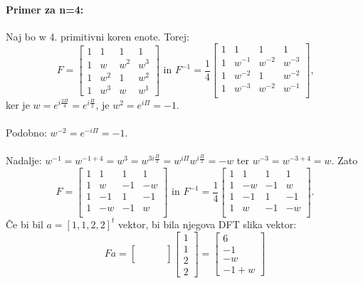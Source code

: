 \documentclass[a4paper,10pt]{article}
\begin{document}
\paragraph{Primer za n=4:}
Naj bo w 4. primitivni koren enote. Torej:
$$
F=
\left [
\begin{array}{llll}
1 & 1 & 1 & 1 \\
1 & w & w^2 & w^3 \\
1 & w^2 & 1 & w^2 \\
1 & w^3 & w & w^1
\end{array}
\right ]
\mbox{ in }
F^{-1} = \frac{1}{4}
\left [
\begin{array}{llll}
1 & 1 & 1 & 1 \\
1 & w^{-1} & w^{-2} & w^{-3} \\
1 & w^{-2} & 1 & w^{-2} \\
1 & w^{-3} & w^{-2} & w^{-1} \\
\end{array}
\right ]
\mbox{,}
$$
ker je $w = e^{i \frac{2 \Pi}{4}} = e^{i \frac{\Pi}{2}}$, je $w^2 = e^{i \Pi} = -1$.\\
\\
Podobno: $w^{-2} = e^{-i \Pi} = -1$.\\
\\
Nadalje: $w^{-1} = w^{-1 + 4} = w^3 = w^{3i \frac{\Pi}{2}} = w^{i \Pi}w^{i \frac{\Pi}{2}} = -w$ ter $w^{-3} = w^{-3 + 4} = w$. Zato
$$
F = 
\left [
\begin{array}{llll}
1 & 1 & 1 & 1 \\
1 & w & -1 & -w \\
1 & -1 & 1 & -1 \\
1 & -w & -1 & w \\
\end{array}
\right ]
\mbox{ in }
F^{-1} = \frac{1}{4}
\left [
\begin{array}{llll}
1 & 1 & 1 & 1 \\
1 & -w & -1 & w \\
1 & -1 & 1 & -1 \\
1 & w & -1 & -w \\
\end{array}
\right ]
\mbox{.}
$$
\v Ce bi bil $a = [1,1,2,2]^t$ vektor, bi bila njegova DFT slika vektor:\\
$$
Fa =
\left [
\begin{array}{c}
\;\;\;\;\;\;\;\; \\
\;\;\;\;\;\;\;\; \\
\;\;\;\;\;\;\;\; \\
\;\;\;\;\;\;\;\;
\end{array}
\right ]
\left [
\begin{array}{c}
1 \\
1 \\
2 \\
2
\end{array}
\right ]
=
\left [
\begin{array}{c}
6 \\
-1 \\
-w \\
-1 + w
\end{array}
\right ]
$$
\end{document}
